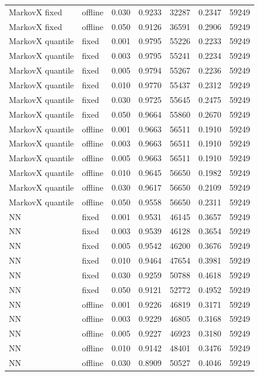 \documentclass{article}
\begin{document}
\begin{longtable}[htbp]{l|l|l|*{4}{c}}
    MarkovX fixed & offline & 0.030 & 0.9233 & 32287 & 0.2347 & 59249\\
    MarkovX fixed & offline & 0.050 & 0.9126 & 36591 & 0.2906 & 59249\\
    MarkovX quantile & fixed & 0.001 & 0.9795 & 55226 & 0.2233 & 59249\\
    MarkovX quantile & fixed & 0.003 & 0.9795 & 55241 & 0.2234 & 59249\\
    MarkovX quantile & fixed & 0.005 & 0.9794 & 55267 & 0.2236 & 59249\\
    MarkovX quantile & fixed & 0.010 & 0.9770 & 55437 & 0.2312 & 59249\\
    MarkovX quantile & fixed & 0.030 & 0.9725 & 55645 & 0.2475 & 59249\\
    MarkovX quantile & fixed & 0.050 & 0.9664 & 55860 & 0.2670 & 59249\\
    MarkovX quantile & offline & 0.001 & 0.9663 & 56511 & 0.1910 & 59249\\
    MarkovX quantile & offline & 0.003 & 0.9663 & 56511 & 0.1910 & 59249\\
    MarkovX quantile & offline & 0.005 & 0.9663 & 56511 & 0.1910 & 59249\\
    MarkovX quantile & offline & 0.010 & 0.9645 & 56650 & 0.1982 & 59249\\
    MarkovX quantile & offline & 0.030 & 0.9617 & 56650 & 0.2109 & 59249\\
    MarkovX quantile & offline & 0.050 & 0.9558 & 56650 & 0.2311 & 59249\\
    NN & fixed & 0.001 & 0.9531 & 46145 & 0.3657 & 59249\\
    NN & fixed & 0.003 & 0.9539 & 46128 & 0.3654 & 59249\\
    NN & fixed & 0.005 & 0.9542 & 46200 & 0.3676 & 59249\\
    NN & fixed & 0.010 & 0.9464 & 47654 & 0.3981 & 59249\\
    NN & fixed & 0.030 & 0.9259 & 50788 & 0.4618 & 59249\\
    NN & fixed & 0.050 & 0.9121 & 52772 & 0.4952 & 59249\\
    NN & offline & 0.001 & 0.9226 & 46819 & 0.3171 & 59249\\
    NN & offline & 0.003 & 0.9229 & 46805 & 0.3168 & 59249\\
    NN & offline & 0.005 & 0.9227 & 46923 & 0.3180 & 59249\\
    NN & offline & 0.010 & 0.9142 & 48401 & 0.3476 & 59249\\
    NN & offline & 0.030 & 0.8909 & 50527 & 0.4046 & 59249\\

\end{longtable}
\end{document}
